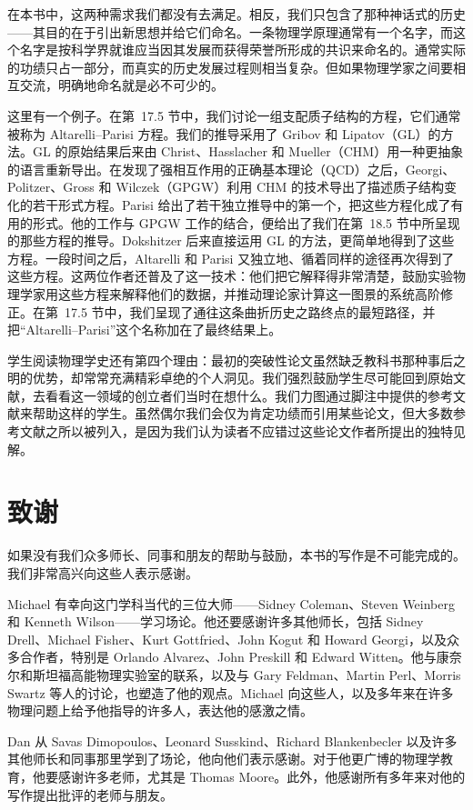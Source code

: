 在本书中，这两种需求我们都没有去满足。相反，我们只包含了那种神话式的历史——其目的在于引出新思想并给它们命名。一条物理学原理通常有一个名字，而这个名字是按科学界就谁应当因其发展而获得荣誉所形成的共识来命名的。通常实际的功绩只占一部分，而真实的历史发展过程则相当复杂。但如果物理学家之间要相互交流，明确地命名就是必不可少的。

这里有一个例子。在第~17.5 节中，我们讨论一组支配质子结构的方程，它们通常被称为 Altarelli--Parisi 方程。我们的推导采用了 Gribov 和 Lipatov（GL）的方法。GL 的原始结果后来由 Christ、Hasslacher 和 Mueller（CHM）用一种更抽象的语言重新导出。在发现了强相互作用的正确基本理论（QCD）之后，Georgi、Politzer、Gross 和 Wilczek（GPGW）利用 CHM 的技术导出了描述质子结构变化的若干形式方程。Parisi 给出了若干独立推导中的第一个，把这些方程化成了有用的形式。他的工作与 GPGW 工作的结合，便给出了我们在第~18.5 节中所呈现的那些方程的推导。Dokshitzer 后来直接运用 GL 的方法，更简单地得到了这些方程。一段时间之后，Altarelli 和 Parisi 又独立地、循着同样的途径再次得到了这些方程。这两位作者还普及了这一技术：他们把它解释得非常清楚，鼓励实验物理学家用这些方程来解释他们的数据，并推动理论家计算这一图景的系统高阶修正。在第~17.5 节中，我们呈现了通往这条曲折历史之路终点的最短路径，并把``Altarelli--Parisi''这个名称加在了最终结果上。

学生阅读物理学史还有第四个理由：最初的突破性论文虽然缺乏教科书那种事后之明的优势，却常常充满精彩卓绝的个人洞见。我们强烈鼓励学生尽可能回到原始文献，去看看这一领域的创立者们当时在想什么。我们力图通过脚注中提供的参考文献来帮助这样的学生。虽然偶尔我们会仅为肯定功绩而引用某些论文，但大多数参考文献之所以被列入，是因为我们认为读者不应错过这些论文作者所提出的独特见解。

\section*{致谢}

如果没有我们众多师长、同事和朋友的帮助与鼓励，本书的写作是不可能完成的。我们非常高兴向这些人表示感谢。

Michael 有幸向这门学科当代的三位大师——Sidney Coleman、Steven Weinberg 和 Kenneth Wilson——学习场论。他还要感谢许多其他师长，包括 Sidney Drell、Michael Fisher、Kurt Gottfried、John Kogut 和 Howard Georgi，以及众多合作者，特别是 Orlando Alvarez、John Preskill 和 Edward Witten。他与康奈尔和斯坦福高能物理实验室的联系，以及与 Gary Feldman、Martin Perl、Morris Swartz 等人的讨论，也塑造了他的观点。Michael 向这些人，以及多年来在许多物理问题上给予他指导的许多人，表达他的感激之情。

Dan 从 Savas Dimopoulos、Leonard Susskind、Richard Blankenbecler 以及许多其他师长和同事那里学到了场论，他向他们表示感谢。对于他更广博的物理学教育，他要感谢许多老师，尤其是 Thomas Moore。此外，他感谢所有多年来对他的写作提出批评的老师与朋友。

